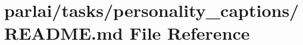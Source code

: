 \hypertarget{parlai_2tasks_2personality__captions_2README_8md}{}\section{parlai/tasks/personality\+\_\+captions/\+R\+E\+A\+D\+ME.md File Reference}
\label{parlai_2tasks_2personality__captions_2README_8md}
